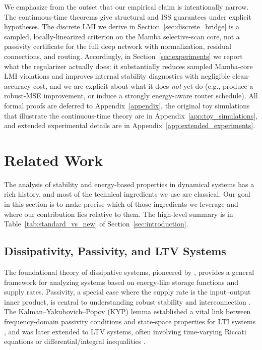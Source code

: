 \documentclass[10pt]{article} %
\theoremstyle{definition}
\begin{document}
We emphasize from the outset that our empirical claim is intentionally narrow. The continuous-time theorems give structural and ISS guarantees under explicit hypotheses. The discrete LMI we derive in Section~\ref{sec:discrete_bridge} is a sampled, locally-linearized criterion on the Mamba selective-scan core, not a passivity certificate for the full deep network with normalization, residual connections, and routing. Accordingly, in Section~\ref{sec:experiments} we report what the regularizer actually does: it substantially reduces sampled Mamba-core LMI violations and improves internal stability diagnostics with negligible clean-accuracy cost, and we are explicit about what it does \emph{not} yet do (e.g., produce a robust-MSE improvement, or induce a strongly energy-aware router schedule). All formal proofs are deferred to Appendix~\ref{appendix}, the original toy simulations that illustrate the continuous-time theory are in Appendix~\ref{app:toy_simulations}, and extended experimental details are in Appendix~\ref{app:extended_experiments}.

\section{Related Work}
\label{sec:related_work}
The analysis of stability and energy-based properties in dynamical systems has a rich history, and most of the technical ingredients we use are classical. Our goal in this section is to make precise which of those ingredients we leverage and where our contribution lies relative to them. The high-level summary is in Table~\ref{tab:standard_vs_new} of Section~\ref{sec:introduction}.

\subsection{Dissipativity, Passivity, and LTV Systems}
The foundational theory of dissipative systems, pioneered by \citet{Willems1972DissipativeDS}, provides a general framework for analyzing systems based on energy-like storage functions and supply rates. Passivity, a special case where the supply rate is the input--output inner product, is central to understanding robust stability and interconnection \citep{van2000l2}. The Kalman--Yakubovich--Popov (KYP) lemma established a vital link between frequency-domain passivity conditions and state-space properties for LTI systems \citep{kalman1963lyapunov, popov1961absolute}, and was later extended to LTV systems, often involving time-varying Riccati equations or differential/integral inequalities \citep{anderson2013network}.
\end{document}
